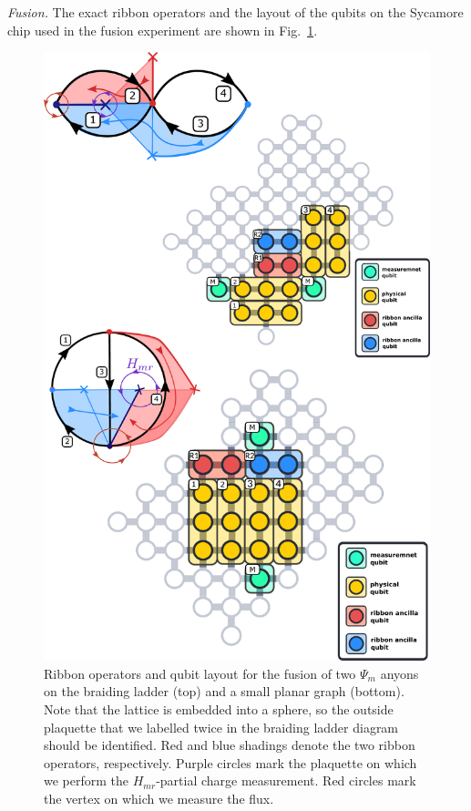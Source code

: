 \documentclass[a4paper,twocolumn,11pt]{quantumarticle}
\begin{document}
\emph{Fusion.} 
The exact ribbon operators and the layout of the qubits on the Sycamore chip used in the fusion experiment are shown in Fig.~\ref{fig:fusion_setup}.
\begin{figure}
	\centering
	\includegraphics[width=\linewidth]{Figures/basket_fusion.pdf}
	\caption{Ribbon operators and qubit layout for the fusion of two $\Psi_m$ anyons on the braiding ladder (top) and a small planar graph (bottom). Note that the lattice is embedded into a sphere, so the outside plaquette that we labelled twice in the braiding ladder diagram should be identified. Red and blue shadings denote the two ribbon operators, respectively. Purple circles mark the plaquette on which we perform the $H_{mr}$-partial charge measurement. Red circles mark the vertex on which we measure the flux.}
	\label{fig:fusion_setup}
\end{figure}
\end{document}
